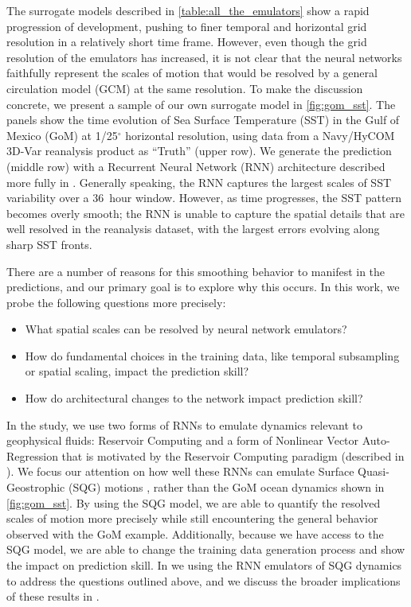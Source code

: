

The surrogate models described in \cref{table:all_the_emulators} show a
rapid progression of development, pushing to finer temporal and horizontal grid
resolution in a relatively short time frame.
However, even though the grid resolution of the emulators has increased, it is
not clear that the neural networks faithfully represent the scales of motion
that would be resolved by a general circulation model (GCM) at the same
resolution.
To make the discussion concrete, we present a sample of our own surrogate model
in \cref{fig:gom_sst}.
The panels show the time evolution of Sea Surface
Temperature (SST) in the Gulf of Mexico (GoM) at 1/25$^\circ$ horizontal resolution,
using data from a Navy/HyCOM 3D-Var reanalysis product  as
``Truth'' (upper row).
We generate the prediction (middle row) with a Recurrent Neural Network (RNN) architecture
described more fully in .
Generally speaking, the RNN captures the largest scales of SST variability over
a 36~hour window.
However, as time progresses, the SST pattern becomes overly smooth;
the RNN is
unable to capture the spatial details that are well resolved in the reanalysis
dataset, with the largest errors evolving along sharp SST fronts.

There are a number of reasons for this smoothing behavior to manifest in the
predictions, and our primary goal is to explore why this occurs.
In this work, we probe the following questions more precisely:
\begin{itemize}
    \item What spatial scales can be resolved by neural network emulators?
    \item How do fundamental choices in the training data, like temporal
        subsampling or spatial scaling, impact the prediction skill?
    \item How do architectural changes to the network impact prediction skill?
\end{itemize}
In the study, we use two forms of RNNs to emulate dynamics relevant to
geophysical fluids: Reservoir Computing and a form of Nonlinear Vector
Auto-Regression that is motivated by the Reservoir Computing paradigm (described
in ).
We focus our attention on how well these RNNs can emulate Surface
Quasi-Geostrophic (SQG) motions , rather than the GoM ocean dynamics shown in
\cref{fig:gom_sst}.
By using the SQG model, we are able to quantify the resolved scales of motion more
precisely while still encountering the general behavior observed with the GoM
example.
Additionally, because we have access to the SQG model, we are able
to change the training data generation process and show the impact on prediction
skill.
In  we using the RNN emulators of SQG dynamics to address the
questions outlined above, and we discuss the broader implications of these
results in .


